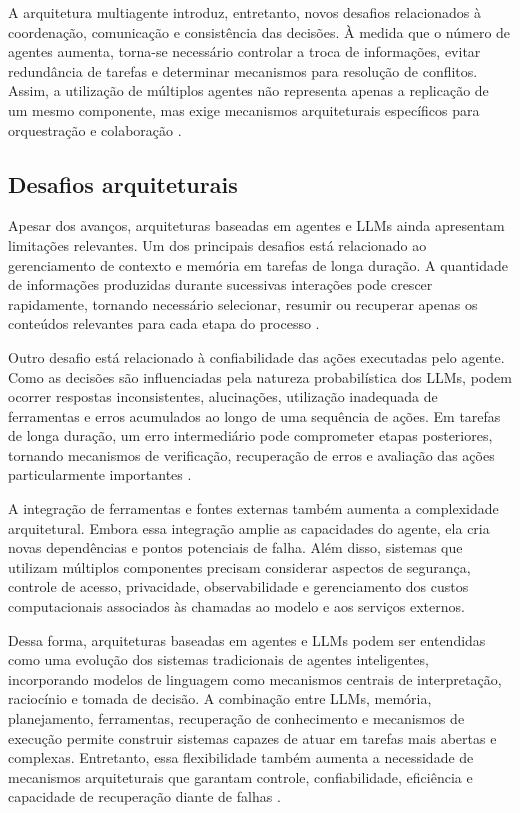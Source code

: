 A arquitetura multiagente introduz, entretanto, novos desafios relacionados à coordenação, comunicação e consistência das decisões. À medida que o número de agentes aumenta, torna-se necessário controlar a troca de informações, evitar redundância de tarefas e determinar mecanismos para resolução de conflitos. Assim, a utilização de múltiplos agentes não representa apenas a replicação de um mesmo componente, mas exige mecanismos arquiteturais específicos para orquestração e colaboração \cite{cheng2026}.

\subsection{Desafios arquiteturais}

Apesar dos avanços, arquiteturas baseadas em agentes e LLMs ainda apresentam limitações relevantes. Um dos principais desafios está relacionado ao gerenciamento de contexto e memória em tarefas de longa duração. A quantidade de informações produzidas durante sucessivas interações pode crescer rapidamente, tornando necessário selecionar, resumir ou recuperar apenas os conteúdos relevantes para cada etapa do processo \cite{zhao2023survey}.

Outro desafio está relacionado à confiabilidade das ações executadas pelo agente. Como as decisões são influenciadas pela natureza probabilística dos LLMs, podem ocorrer respostas inconsistentes, alucinações, utilização inadequada de ferramentas e erros acumulados ao longo de uma sequência de ações. Em tarefas de longa duração, um erro intermediário pode comprometer etapas posteriores, tornando mecanismos de verificação, recuperação de erros e avaliação das ações particularmente importantes \cite{cheng2026,zhao2023survey}.

A integração de ferramentas e fontes externas também aumenta a complexidade arquitetural. Embora essa integração amplie as capacidades do agente, ela cria novas dependências e pontos potenciais de falha. Além disso, sistemas que utilizam múltiplos componentes precisam considerar aspectos de segurança, controle de acesso, privacidade, observabilidade e gerenciamento dos custos computacionais associados às chamadas ao modelo e aos serviços externos.

Dessa forma, arquiteturas baseadas em agentes e LLMs podem ser entendidas como uma evolução dos sistemas tradicionais de agentes inteligentes, incorporando modelos de linguagem como mecanismos centrais de interpretação, raciocínio e tomada de decisão. A combinação entre LLMs, memória, planejamento, ferramentas, recuperação de conhecimento e mecanismos de execução permite construir sistemas capazes de atuar em tarefas mais abertas e complexas. Entretanto, essa flexibilidade também aumenta a necessidade de mecanismos arquiteturais que garantam controle, confiabilidade, eficiência e capacidade de recuperação diante de falhas \cite{muller1999,cheng2026,zhao2023survey}.


